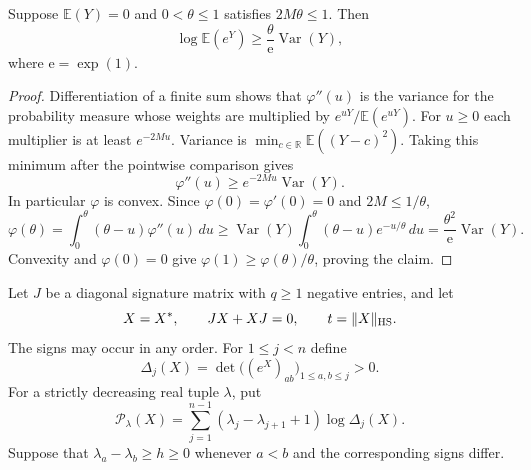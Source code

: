 \begin{lemma}\label{amb-variance}
Suppose $\mathbb E(Y)=0$ and $0<\theta\le1$ satisfies
$2M\theta\le1$. Then
\[
                     \log\mathbb E(e^Y)
                  \ge\frac{\theta}{\mathrm e}\operatorname{Var}(Y),
\]
where $\mathrm e=\exp(1)$.
\end{lemma}
\begin{proof}
Differentiation of a finite sum shows that $\varphi''(u)$ is
the variance for the probability measure whose weights are
multiplied by $e^{uY}/\mathbb E(e^{uY})$.
For $u\ge0$ each multiplier is at least $e^{-2Mu}$.
Variance is $\min_{c\in\mathbb R}\mathbb E((Y-c)^2)$.
Taking this minimum after the pointwise comparison gives
\[
                \varphi''(u)\ge e^{-2Mu}\operatorname{Var}(Y).
\]
In particular $\varphi$ is convex. Since
$\varphi(0)=\varphi'(0)=0$ and $2M\le1/\theta$,
\[
 \varphi(\theta)
   =\int_0^\theta(\theta-u)\varphi''(u)\,du
   \ge\operatorname{Var}(Y)
             \int_0^\theta(\theta-u)e^{-u/\theta}\,du
   =\frac{\theta^2}{\mathrm e}\operatorname{Var}(Y).
\]
Convexity and $\varphi(0)=0$ give
$\varphi(1)\ge\varphi(\theta)/\theta$, proving the claim.
\end{proof}

Let $J$ be a diagonal signature matrix with $q\ge1$ negative
entries, and let
\[
             X=X^*,\qquad JX+XJ=0,\qquad t=\|X\|_{\rm HS}.
\]
The signs may occur in any order. For $1\le j<n$ define
\[
 \Delta_j(X)=\det\bigl((e^X)_{a b}\bigr)_{1\le a,b\le j}>0.
\]
For a strictly decreasing real tuple $\lambda$, put
\begin{equation}\label{amb-phase}
 \mathcal P_\lambda(X)=
       \sum_{j=1}^{n-1}(\lambda_j-\lambda_{j+1}+1)
                                      \log\Delta_j(X).
\end{equation}
Suppose that $\lambda_a-\lambda_b\ge h\ge0$ whenever
$a<b$ and the corresponding signs differ.

